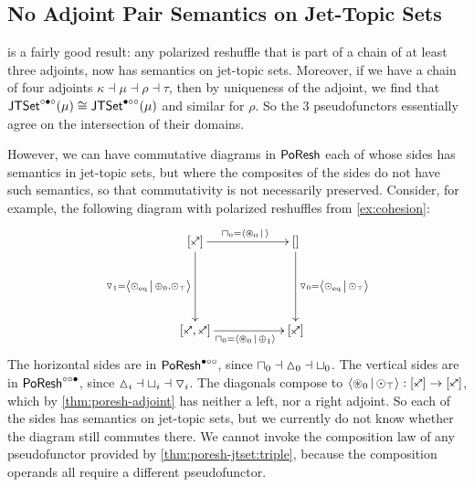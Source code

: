 \documentclass[a4paper]{memoir}
\begin{document}
\subsection{No Adjoint Pair Semantics on Jet-Topic Sets} \label{sec:poresh-jtset:nogo}
 is a fairly good result: any polarized reshuffle that is part of a chain of at least three adjoints, now has semantics on jet-topic sets.
Moreover, if we have a chain of four adjoints $\kappa \dashv \mu \dashv \rho \dashv \tau$, then by uniqueness of the adjoint, we find that $\mathsf{JTSet}^{\circ \bullet \circ}(\mu) \cong \mathsf{JTSet}^{\bullet \circ \circ}(\mu)$ and similar for $\rho$.
So the 3 pseudofunctors essentially agree on the intersection of their domains.

However, we can have commutative diagrams in $\mathsf{PoResh}$ each of whose sides has semantics in jet-topic sets, but where the composites of the sides do not have such semantics, so that commutativity is not necessarily preserved.
Consider, for example, the following diagram with polarized reshuffles from \cref{ex:cohesion}:
\[
	\xymatrix{
		[\ypolar]
			\ar[rr]^{\cohpi_0 = \reshlist{\isopol_0}{}}
			\ar[dd]_{\cohcodisc_1 = \reshlist{\nonpol_\eqtydeg}{\pospol_0, \nonpol_\top}}
		&&
		[]
			\ar[dd]^{\cohcodisc_0 = \reshlist{\nonpol_\eqtydeg}{\nonpol_\top}}
		\\ \\
		[\ypolar, \ypolar]
			\ar[rr]_{\cohpi_0 = \reshlist{\isopol_0}{\pospol_1}}
		&&
		[\ypolar]
	}
\]
The horizontal sides are in $\mathsf{PoResh}^{\bullet \circ \circ}$, since ${\sqcap}_0 \dashv {\vartriangle}_0 \dashv {\sqcup}_0$.
The vertical sides are in $\mathsf{PoResh}^{\circ \circ \bullet}$, since ${\vartriangle}_i \dashv {\sqcup}_i \dashv {\triangledown}_i$.
The diagonals compose to $\reshlist{\isopol_0}{\nonpol_\top} : [\ypolar] \to [\ypolar]$, which by \cref{thm:poresh-adjoint} has neither a left, nor a right adjoint.
So each of the sides has semantics on jet-topic sets, but we currently do not know whether the diagram still commutes there.
We cannot invoke the composition law of any pseudofunctor provided by \cref{thm:poresh-jtset:triple}, because the composition operands all require a different pseudofunctor.
\end{document}
